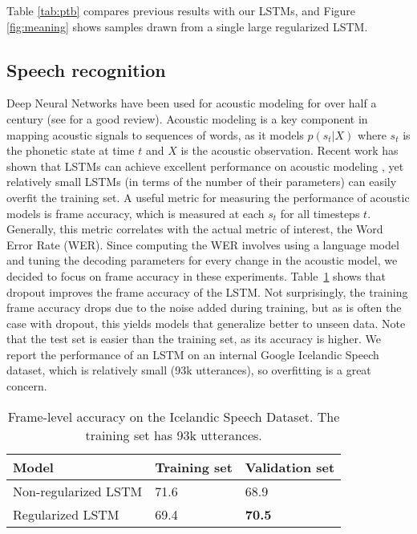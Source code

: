 \documentclass{article} %
\begin{document}
Table \ref{tab:ptb} compares previous results with our LSTMs, and
Figure \ref{fig:meaning} shows samples drawn from a single large 
regularized LSTM.


\subsection{Speech recognition}
\label{sec:speech}

Deep Neural Networks have been used for acoustic modeling for over half a century (see
\citet{BourlardASR} for a good review). Acoustic modeling is a key
component in mapping acoustic signals to sequences of words, as it
models $p(s_t|X)$ where $s_t$ is the phonetic state at time $t$ and $X$
is the acoustic observation. Recent work has shown that LSTMs can 
achieve excellent performance on acoustic modeling \cite{sak2014speech}, yet
relatively small LSTMs (in terms of the number of their parameters) can
easily overfit the training set. A useful metric for measuring the performance of acoustic models is frame
accuracy, which is measured at each $s_t$ for all timesteps
$t$. Generally, this metric correlates with the actual metric of
interest, the Word Error Rate (WER). Since computing the WER
involves using a language model and tuning the decoding parameters for
every change in the acoustic model, we decided to focus on frame
accuracy in these experiments. Table~\ref{tab:speech} shows
that dropout improves the frame accuracy of the LSTM. Not
surprisingly, the training frame accuracy drops due to the noise added
during training, but as is often the case with dropout, this yields
models that generalize better to unseen data. Note that the test
set is easier than the training set, as its accuracy is higher.  We
report the performance of an LSTM on an internal Google Icelandic
Speech dataset, which is relatively small (93k utterances), so
overfitting is a great concern.

\begin{table}[t]
  \small
  \centering
  \renewcommand{\arraystretch}{1.15}
  \begin{tabular}{lll}
    \hline
     Model & Training set & Validation set \\
    \hline
    Non-regularized LSTM & 71.6 & 68.9 \\
    Regularized LSTM & 69.4 & {\bf 70.5} \\
    \hline
  \end{tabular}
  \caption{Frame-level accuracy on the Icelandic Speech Dataset. The training set has 93k utterances.}
  \label{tab:speech}
\end{table}
\end{document}
